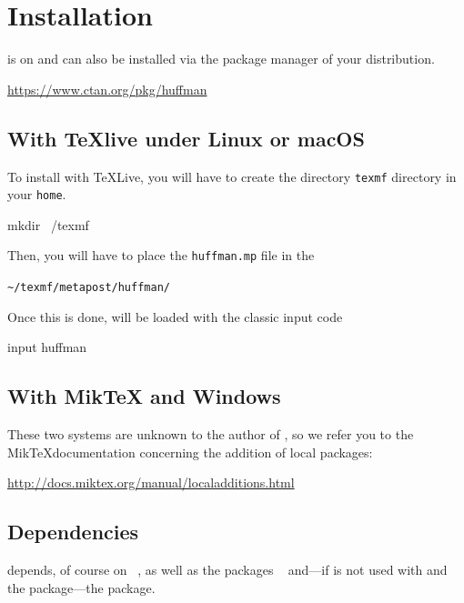 \documentclass[english]{ltxdoc}
\begin{document}
\section{Installation}

\huffman is on \ctan{} and can also be installed via the package manager of your
distribution.

\begin{center}
  \url{https://www.ctan.org/pkg/huffman}
\end{center}


\subsection{With \TeX live under Linux or macOS}

To install \huffman with \TeX Live, you will have to create the directory
\lstinline+texmf+ directory in your \lstinline+home+. 

\begin{commandshell}
mkdir ~/texmf
\end{commandshell}

Then, you will have to place the \lstinline+huffman.mp+ file in the 
\begin{center}
  \lstinline+~/texmf/metapost/huffman/+
\end{center}


Once this is done, \huffman will be loaded with the classic \MP
input code
\begin{mpcode}
input huffman
\end{mpcode}

\subsection{With Mik\TeX{} and Windows}

These two systems are unknown to the author of \huffman, so we
refer you to the Mik\TeX documentation concerning the addition of local packages:
\begin{center}
  \url{http://docs.miktex.org/manual/localadditions.html}
\end{center}



\subsection{Dependencies}


\huffman depends, of course on \MP~\cite{ctan-metapost}, as well as the packages ~\cite{ctan-metaobj}
and---if \huffman is not used with  and the 
package---the  package.
\end{document}
